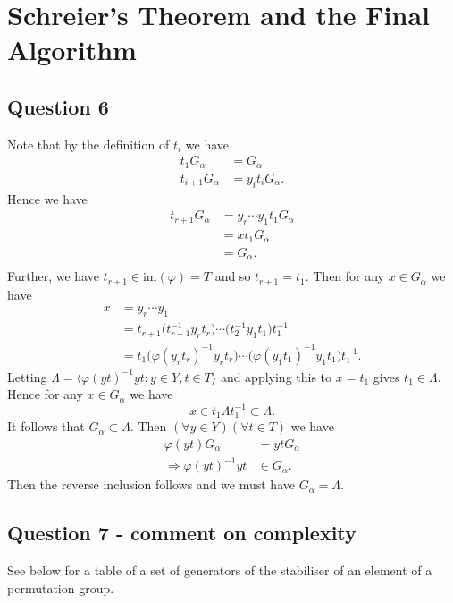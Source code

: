 \documentclass{article}
\begin{document}
\section{Schreier's Theorem and the Final Algorithm}
\subsection{Question 6}
Note that by the definition of $t_i$ we have
\begin{align*}
		t_1G_\alpha & =G_\alpha\\
		t_{i+1}G_\alpha & = y_it_iG_\alpha .
\end{align*}
Hence we have
\begin{align*}
		t_{r+1}G_\alpha & =y_r\cdots y_1t_1G_\alpha\\
								 & = xt_1G_\alpha \\
								 & = G_\alpha. \\
\end{align*}
Further, we have $t_{r+1}\in \text{im}(\varphi)=T$ and so $t_{r+1}=t_1$. Then for any $x\in G_\alpha$ we have
\begin{align*}
		x &= y_r\cdots y_1\\
		   &= t_{r+1}\big(t_{r+1}^{-1}y_rt_r\big)\cdots \big(t_2^{-1}y_1t_{1}\big)t_1^{-1}\\
		   &= t_{1}\big(\varphi(y_rt_r)^{-1}y_rt_r\big)\cdots \big(\varphi(y_1t_1)^{-1}y_1t_1\big)t_1^{-1}.		   
\end{align*}
Letting $\Lambda=\big\langle \varphi(yt)^{-1}yt: y\in Y, t\in T\big\rangle$ and applying this to $x=t_1$ gives $t_1\in \Lambda $. 
Hence for any $x\in G_\alpha$ we have 
\[x\in t_1 \Lambda t_1^{-1}\subset  \Lambda .\]
It follows that $G_\alpha\subset  \Lambda$. Then $(\forall y\in Y)(\forall t\in T)$ we have
\begin{align*}
				 \varphi(yt)G_\alpha& =ytG_\alpha\\
					\Rightarrow \varphi(yt)^{-1}yt &\in G_\alpha.
\end{align*}
Then the reverse inclusion follows and we must have $G_\alpha= \Lambda$. 
\subsection{Question 7 - comment on complexity}
See below for a table of a set of generators of the stabiliser of an element of a permutation group.
\end{document}
